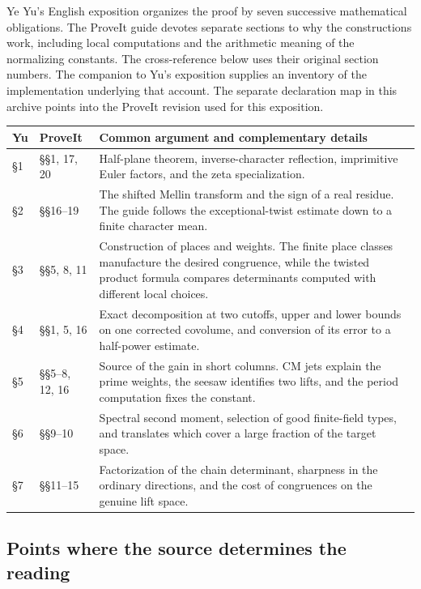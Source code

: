 Ye Yu's English exposition organizes the proof by seven successive mathematical obligations. The ProveIt guide devotes separate sections to why the constructions work, including local computations and the arithmetic meaning of the normalizing constants. The cross-reference below uses their original section numbers. The companion to Yu's exposition supplies an inventory of the implementation underlying that account. The separate declaration map in this archive points into the ProveIt revision used for this exposition.

\begin{center}
\begin{tabular}{@{}p{.18\linewidth}p{.15\linewidth}p{.57\linewidth}@{}}
\hline
\textbf{Yu} & \textbf{ProveIt} & \textbf{Common argument and complementary details}\\
\hline
\S1 & \S\S1, 17, 20 & Half-plane theorem, inverse-character reflection, imprimitive Euler factors, and the zeta specialization.\\[3pt]
\S2 & \S\S16--19 & The shifted Mellin transform and the sign of a real residue. The guide follows the exceptional-twist estimate down to a finite character mean.\\[3pt]
\S3 & \S\S5, 8, 11 & Construction of places and weights. The finite place classes manufacture the desired congruence, while the twisted product formula compares determinants computed with different local choices.\\[3pt]
\S4 & \S\S1, 5, 16 & Exact decomposition at two cutoffs, upper and lower bounds on one corrected covolume, and conversion of its error to a half-power estimate.\\[3pt]
\S5 & \S\S5--8, 12, 16 & Source of the gain in short columns. CM jets explain the prime weights, the seesaw identifies two lifts, and the period computation fixes the constant.\\[3pt]
\S6 & \S\S9--10 & Spectral second moment, selection of good finite-field types, and translates which cover a large fraction of the target space.\\[3pt]
\S7 & \S\S11--15 & Factorization of the chain determinant, sharpness in the ordinary directions, and the cost of congruences on the genuine lift space.\\
\hline
\end{tabular}
\end{center}

\subsection{Points where the source determines the reading}

